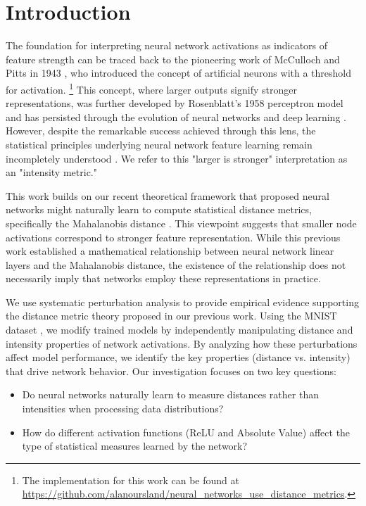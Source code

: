 \section{Introduction}

The foundation for interpreting neural network activations as indicators of feature strength can be traced back to the pioneering work of McCulloch and Pitts in 1943 \citep{mcculloch1943logical}, who introduced the concept of artificial neurons with a threshold for activation. \footnote{The implementation for this work can be found at \url{https://github.com/alanoursland/neural_networks_use_distance_metrics}.} This concept, where larger outputs signify stronger representations, was further developed by Rosenblatt's 1958 perceptron model \citep{rosenblatt1958perceptron} and has persisted through the evolution of neural networks and deep learning \citep{schmidhuber2015deep}. However, despite the remarkable success achieved through this lens, the statistical principles underlying neural network feature learning remain incompletely understood \citep{lipton2018mythos}. We refer to this "larger is stronger" interpretation as an "intensity metric." \citep{simonyan2013deep}

This work builds on our recent theoretical framework \citep{oursland2024interpreting} that proposed neural networks might naturally learn to compute statistical distance metrics, specifically the Mahalanobis distance \citep{mahalanobis1936generalized}. This viewpoint suggests that smaller node activations correspond to stronger feature representation. While this previous work established a mathematical relationship between neural network linear layers and the Mahalanobis distance, the existence of the relationship does not necessarily imply that networks employ these representations in practice. 

We use systematic perturbation analysis \citep{szegedy2013intriguing, goodfellow2014explaining} to provide empirical evidence supporting the distance metric theory proposed in our previous work. Using the MNIST dataset \citep{lecun1998gradient}, we modify trained models by independently manipulating distance and intensity properties of network activations. By analyzing how these perturbations affect model performance, we identify the key properties (distance vs. intensity) that drive network behavior. Our investigation focuses on two key questions:

\begin{itemize}
    \item Do neural networks naturally learn to measure distances rather than intensities when processing data distributions?
    \item How do different activation functions (ReLU and Absolute Value) affect the type of statistical measures learned by the network?
\end{itemize}


